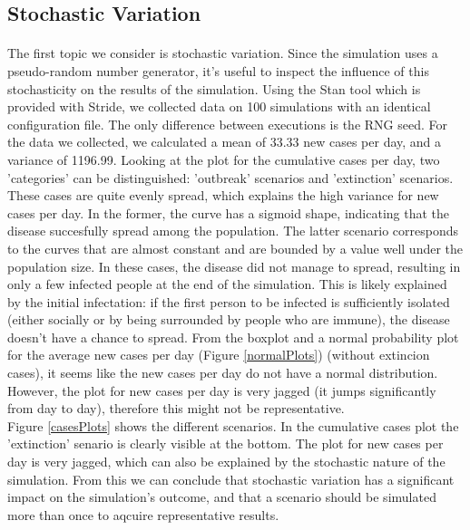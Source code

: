 \documentclass[runningheads]{llncs}
\begin{document}
\subsection{Stochastic Variation}
\paragraph{} The first topic we consider is stochastic variation. Since the simulation uses a pseudo-random number generator, it's useful to inspect the influence of this stochasticity on the results of the simulation. Using the Stan tool which is provided with Stride, we collected data on 100 simulations with an identical configuration file. The only difference between executions is the RNG seed. For the data we collected, we calculated a  mean of 33.33 new cases per day, and a variance of 1196.99. Looking at the plot for the cumulative cases per day, two 'categories' can be distinguished:  'outbreak' scenarios and 'extinction' scenarios. These cases are quite evenly spread, which explains the high variance for new cases per day. In the former, the curve has a sigmoid shape, indicating that the disease succesfully spread among the population. The latter scenario corresponds to the curves that are almost constant and are bounded by a value well under the population size. In these cases, the disease did not manage to spread, resulting in only a few infected people at the end of the simulation. This is likely explained by the initial infectation: if the first person to be infected is sufficiently isolated (either socially or by being surrounded by people who are immune), the disease doesn't have a chance to spread. From the boxplot and a normal probability plot for the average new cases per day (Figure \ref{normalPlots}) (without extincion cases), it seems like the new cases per day do not have a normal distribution. However, the plot for new cases per day is very jagged (it jumps significantly from day to day), therefore this might not be representative. 
\\
Figure \ref{casesPlots} shows the different scenarios. In the cumulative cases plot the 'extinction' senario is clearly visible at the bottom. The plot for new cases per day is very jagged, which can also be explained by the stochastic nature of the simulation. From this we can conclude that stochastic variation has a significant impact on the simulation's outcome, and that a scenario should be simulated more than once to aqcuire representative results. 
\end{document}
